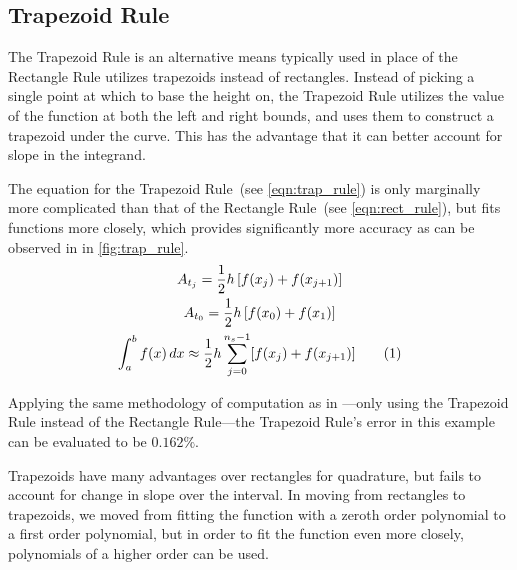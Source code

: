 \documentclass{paper}
\begin{document}
\subsection{Trapezoid Rule}
\label{sec:trap_rule}
The Trapezoid Rule is an alternative means typically used in place of the Rectangle Rule utilizes trapezoids instead of rectangles.
Instead of picking a single point at which to base the height on, the Trapezoid Rule utilizes the value of the function at both the left and right bounds, and uses them to construct a trapezoid under the curve.
This has the advantage that it can better account for slope in the integrand.\autocite{num_methods}

The equation for the Trapezoid Rule~(see \cref{eqn:trap_rule}) is only marginally more complicated than that of the Rectangle Rule~(see \cref{eqn:rect_rule}), but fits functions more closely, which provides significantly more accuracy as can be observed in in \cref{fig:trap_rule}.
%
\begin{gather*}
    A_{t_{j}} = \frac{1}{2} h \left[ f(x_{j}) + f(x_{j+1}) \right]                                                                                                \\
    A_{t_{0}} = \frac{1}{2} h \left[f(x_0) + f(x_1)\right]                                                                  \\
    \int_a^b f(x) \,dx \approx \frac{1}{2}h \sum^{n_s-1}_{j=0}[f(x_{j}) + f(x_{j+1})] \tageq\label{eqn:trap_rule} 
\end{gather*}
%

%
Applying the same methodology of computation as in ---only using the Trapezoid Rule instead of the Rectangle Rule---the Trapezoid Rule's error in this example can be evaluated to be \(0.162\%\).

Trapezoids have many advantages over rectangles for quadrature, but fails to account for change in slope over the interval.
In moving from rectangles to trapezoids, we moved from fitting the function with a zeroth order polynomial to a first order polynomial, but in order to fit the function even more closely, polynomials of a higher order can be used.
%
\end{document}
